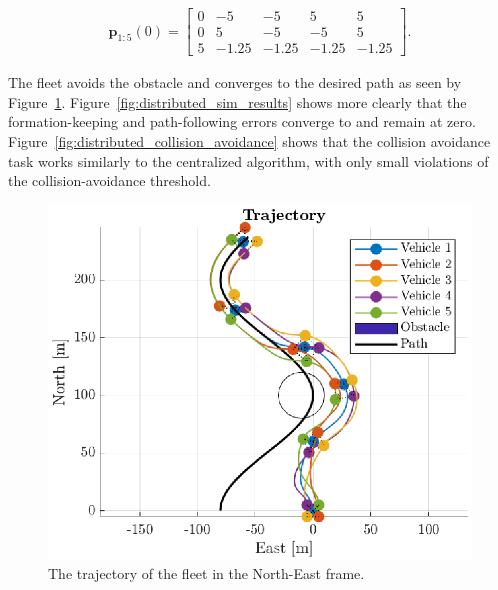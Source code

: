 \begin{equation}
    \begin{split}
    \mathbf{p}_{1:5}(0) = \begin{bmatrix}
        0 &-5& -5& 5& 5\\ 0 & 5 & -5 & -5 & 5\\ 5 & -1.25& -1.25& -1.25& -1.25
    \end{bmatrix}.
    \end{split}
\end{equation}

The fleet avoids the obstacle and converges to the desired path as seen by Figure~\ref{fig:distributed_path_plot}. Figure~\ref{fig:distributed_sim_results} shows more clearly that the formation-keeping and path-following errors converge to and remain at zero. Figure~\ref{fig:distributed_collision_avoidance} shows that the collision avoidance task works similarly to the centralized algorithm, with only small violations of the collision-avoidance threshold. 
\begin{figure}[hb]
    \centering
    \includegraphics[width=.8\textwidth]{figures/distributed_path_plot.eps}
    \vspace{-4mm}
    \caption{The trajectory of the fleet in the North-East frame.}
    \label{fig:distributed_path_plot}
    \vspace{-4mm}
\end{figure}

